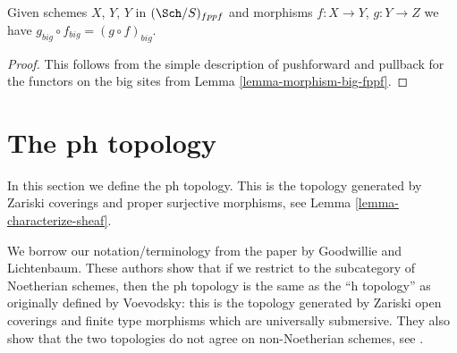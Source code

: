 \begin{lemma}
\label{lemma-composition-fppf}
Given schemes $X$, $Y$, $Y$ in $(\Sch/S)_{fppf}$
and morphisms $f : X \to Y$, $g : Y \to Z$ we have
$g_{big} \circ f_{big} = (g \circ f)_{big}$.
\end{lemma}

\begin{proof}
This follows from the simple description of pushforward
and pullback for the functors on the big sites from
Lemma \ref{lemma-morphism-big-fppf}.
\end{proof}



















































\section{The ph topology}
\label{section-ph}

\noindent
In this section we define the ph topology. This is the topology
generated by Zariski coverings and proper surjective morphisms, see
Lemma \ref{lemma-characterize-sheaf}.

\medskip\noindent
We borrow our notation/terminology
from the paper \cite{ph} by Goodwillie and Lichtenbaum.
These authors show that if we restrict to the subcategory of
Noetherian schemes, then the ph topology is the same as the
``h topology'' as originally defined by Voevodsky: this is
the topology generated by Zariski open coverings and
finite type morphisms which are universally submersive.
They also show that the two topologies do not agree on
non-Noetherian schemes, see \cite[Example 4.5]{ph}.

